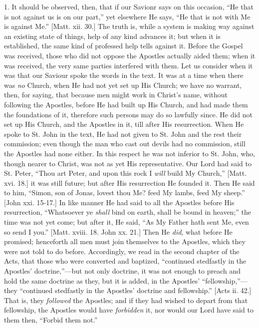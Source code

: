 1. It should be observed, then, that if our Savionr says on this
occasion, ``He that is not against us is on our part,'' yet
elsewhere He says, ``He that is not with Me is against Me.''
[Matt. xii. 30.] The truth is, while a system is making way against an
existing state of things, help of any kind advances it; but when it is
established, the same kind of professed help tells against it. Before
the Gospel was received, those who did not oppose the Apostles
actually aided them; when it was received, the very same parties
interfered with them. Let us consider when it was that our Saviour
spoke the words in the text. It was at a time when there was \emph{no}
Church, when He had not yet set up His Church; we have no warrant,
then, for saying, that because men might work in Christ's name,
without following the Apostles, before He had built up His Church, and
had made them the foundations of it, therefore such persons may do so
lawfully since. He did not set up His Church, and the Apostles in it,
till after His resurrection. When He spoke to St. John in the text, He
had not given to St. John and the rest their commission; even though
the man who cast out devils had no commission, still the Apostles had
none either. In this respect he was not inferior to St. John, who,
though nearer to Christ, was not as yet His representative. Our Lord
had said to St. Peter, ``Thou art Peter, and upon this rock I \emph{will}
build My Church,'' [Matt. xvi. 18.] it was still future; but after
His resurrection He founded it. Then He said to him, ``Simon, son
of Jonas, lovest thou Me? feed My lambs, feed My sheep.'' [John
xxi. 15-17.] In like manner He had said to all the Apostles before His
resurrection, ``Whatsoever ye \emph{shall} bind on earth, shall be
bound in heaven;'' the time was not yet come; but after it, He
said, ``As My Father hath sent Me, even so send I you.''
[Matt. xviii. 18. John xx. 21.] Then He \emph{did}, what before He
promised; henceforth all men must join themselves to the Apostles,
which they were not told to do before. Accordingly, we read in the
second chapter of the Acts, that those who were converted and
baptized, ``continued stedfastly in the Apostles' doctrine,''—but
not only doctrine, it was not enough to preach and hold the same
doctrine as they, but it is added, in the Apostles'
``fellowship,''—they ``continued stedfastly in the
Apostles' doctrine and fellowship.'' [Acts ii. 42.] That is, they \emph{followed} the Apostles; and if they had wished
to depart from that fellowship, the Apostles would have \emph{forbidden}
it, nor would our Lord have said to them then, ``Forbid them
not.''

